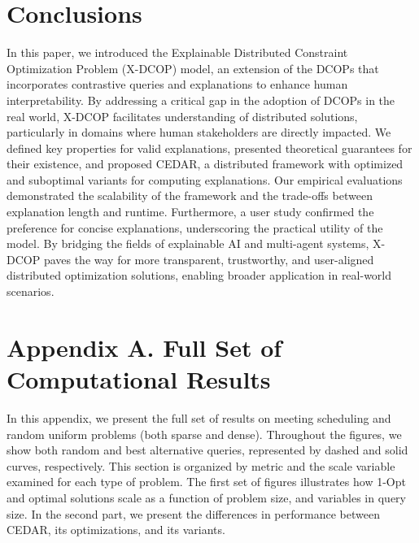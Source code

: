 \documentclass[twoside,11pt]{article}
\begin{document}
\section{Conclusions}

In this paper, we introduced the Explainable Distributed Constraint Optimization Problem (X-DCOP) model, an extension of the DCOPs that incorporates contrastive queries and explanations to enhance human interpretability. By addressing a critical gap in the adoption of DCOPs in the real world, X-DCOP facilitates understanding of distributed solutions, particularly in domains where human stakeholders are directly impacted. We defined key properties for valid explanations, presented theoretical guarantees for their existence, and proposed CEDAR, a distributed framework with optimized and suboptimal variants for computing explanations. Our empirical evaluations demonstrated the scalability of the framework and the trade-offs between explanation length and runtime. Furthermore, a user study confirmed the preference for concise explanations, underscoring the practical utility of the model. By bridging the fields of explainable AI and multi-agent systems, X-DCOP paves the way for more transparent, trustworthy, and user-aligned distributed optimization solutions, enabling broader application in real-world scenarios. 

 



\vskip 0.2in




\section*{Appendix A. Full Set of Computational Results}

In this appendix, we present the full set of results on meeting scheduling and random uniform problems (both sparse and dense). Throughout the figures, we show both random and best alternative queries, represented by dashed and solid curves, respectively. This section is organized by metric and the scale variable examined for each type of problem. The first set of figures illustrates how 1-Opt and optimal solutions scale as a function of problem size, and variables in query size. In the second part, we present the differences in performance between CEDAR, its optimizations, and its variants.
\end{document}
